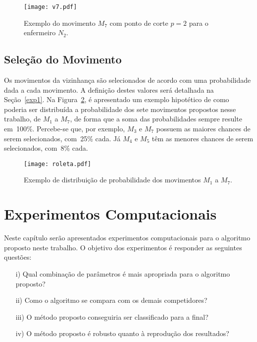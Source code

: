 \documentclass[cic,tc, twoside]{iiufrgs}
\begin{document}
\begin{figure}[ht!]
\texttt{[image: v7.pdf]}
\centering
\caption{Exemplo do movimento $M_7$ com ponto de corte $p=2$ para o enfermeiro $N_2$.} 
\label{fig:vizinhanca7}
\end{figure}

\section{Seleção do Movimento}

Os movimentos da vizinhança são selecionados de acordo com uma probabilidade dada a cada movimento. A definição destes valores será detalhada na Seção~\ref{exp1}. Na Figura~\ref{fig:roleta}, é apresentado um exemplo hipotético de como poderia ser distribuída a probabilidade dos sete movimentos propostos nesse trabalho, de $M_1$ a $M_7$, de forma que a soma das probabilidades sempre resulte em~100\%. Percebe-se que, por exemplo, $M_3$ e $M_7$ possuem as maiores chances de serem selecionados, com~25\% cada. Já $M_4$ e $M_5$ têm as menores chances de serem selecionados, com~8\% cada.

\begin{figure}[ht!]
\texttt{[image: roleta.pdf]}
\centering
\caption{Exemplo de distribuição de probabilidade dos movimentos $M_1$ a $M_7$.\\} 
\label{fig:roleta}
\end{figure}

\chapter{Experimentos Computacionais} \label{ChapR}

Neste capítulo serão apresentados experimentos computacionais para o algoritmo proposto neste trabalho. O objetivo dos experimentos é responder as seguintes questões: 
\medskip
\begin{enumerate}[nosep]
   \item[i)] Qual combinação de parâmetros é mais apropriada para o algoritmo proposto?
   \item[ii)] Como o algoritmo se compara com os demais competidores?
   \item[iii)] O método proposto conseguiria ser classificado para a final? 
   \item[iv)] O método proposto é robusto quanto à reprodução dos resultados?
\end{enumerate}
\medskip
\end{document}
